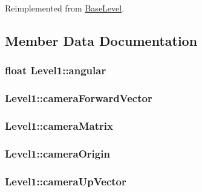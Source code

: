Reimplemented from \hyperlink{class_base_level_adb9988c217366173515d27cb500da5d7}{Base\-Level}.



\subsection{Member Data Documentation}
\hypertarget{class_level1_ad0e4b54788124f6471852123dea5a073}{
\subsubsection[{angular}]{\setlength{\rightskip}{0pt plus 5cm}float Level1\-::angular}}\label{class_level1_ad0e4b54788124f6471852123dea5a073}
\hypertarget{class_level1_ac10903be550984ca56c7511a5a15a025}{
\subsubsection[{camera\-Forward\-Vector}]{ Level1\-::camera\-Forward\-Vector}}\label{class_level1_ac10903be550984ca56c7511a5a15a025}
\hypertarget{class_level1_a6001495527da0e497c56f0136c92eb88}{
\subsubsection[{camera\-Matrix}]{ Level1\-::camera\-Matrix}}\label{class_level1_a6001495527da0e497c56f0136c92eb88}
\hypertarget{class_level1_a92a12d05696e7cca7cf8ad9593d14d69}{
\subsubsection[{camera\-Origin}]{ Level1\-::camera\-Origin}}\label{class_level1_a92a12d05696e7cca7cf8ad9593d14d69}
\hypertarget{class_level1_a274b6360e2d328afa0a9e6965821fcdc}{
\subsubsection[{camera\-Up\-Vector}]{ Level1\-::camera\-Up\-Vector}}\label{class_level1_a274b6360e2d328afa0a9e6965821fcdc}
